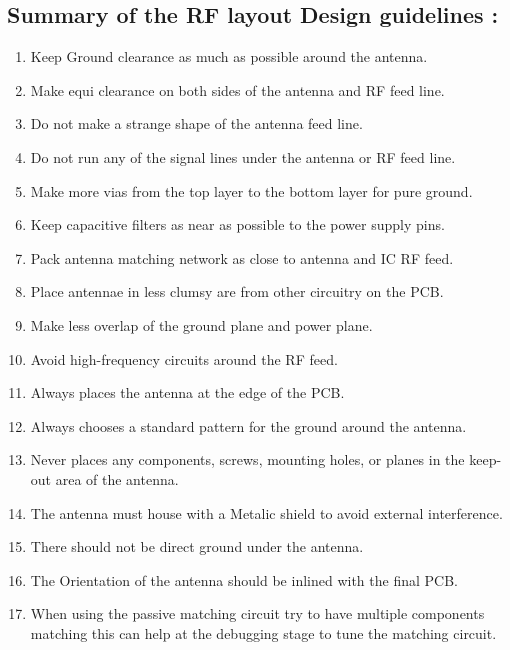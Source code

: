 \subsection{Summary of the RF layout Design guidelines :}
\begin{enumerate}
	\item Keep Ground clearance as much as possible around the antenna.
	\item Make equi clearance on both sides of the antenna and RF feed line.
	\item Do not make a strange shape of the antenna feed line.
	\item Do not run any of the signal lines under the antenna or RF feed line.
	\item Make more vias from the top layer to the bottom layer for pure ground.
	\item Keep capacitive filters as near as possible to the power supply pins.
	\item Pack antenna matching network as close to antenna and IC RF feed.
	\item Place antennae in less clumsy are from other circuitry on the PCB.
	\item Make less overlap of the ground plane and power plane.
	\item Avoid high-frequency circuits around the RF feed.
	\item Always places the antenna at the edge of the PCB.
	\item Always chooses a standard pattern for the ground around the antenna.
	\item Never places any components, screws, mounting holes, or planes in the keep-out area of the antenna.
	\item The antenna must house with a Metalic shield to avoid external interference.
	\item There should not be direct ground under the antenna.
	\item The Orientation of the antenna should be inlined with the final PCB.
	\item When using the passive matching circuit try to have multiple components matching this can help at the debugging stage to tune the matching circuit.
\end{enumerate}

